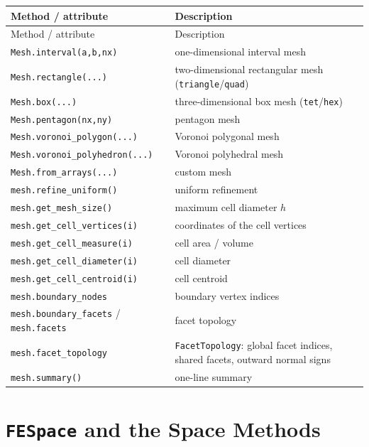 \documentclass[11pt,oneside]{book}
\theoremstyle{definition}
\theoremstyle{plain}
\newcommand{\code}[1]{\texttt{#1}}
\begin{document}
\begingroup\small
\begin{longtable}{@{}L{5.0cm}L{9.4cm}@{}}
\toprule
Method / attribute & Description \\
\midrule
\endfirsthead
\toprule
Method / attribute & Description \\
\midrule
\endhead
\code{Mesh.interval(a,\allowbreak b,\allowbreak nx)} & one-dimensional interval mesh \\
\code{Mesh.rectangle(...)} & two-dimensional rectangular mesh (\code{triangle}/\allowbreak\code{quad}) \\
\code{Mesh.box(...)} & three-dimensional box mesh (\code{tet}/\allowbreak\code{hex}) \\
\code{Mesh.pentagon(nx,\allowbreak ny)} & pentagon mesh \\
\code{Mesh.voronoi\_\allowbreak polygon(...)} & Voronoi polygonal mesh \\
\code{Mesh.voronoi\_\allowbreak polyhedron(...)} & Voronoi polyhedral mesh \\
\code{Mesh.from\_\allowbreak arrays(...)} & custom mesh \\
\code{mesh.refine\_\allowbreak uniform()} & uniform refinement \\
\code{mesh.get\_\allowbreak mesh\_\allowbreak size()} & maximum cell diameter $h$ \\
\code{mesh.get\_\allowbreak cell\_\allowbreak vertices(i)} & coordinates of the cell vertices \\
\code{mesh.get\_\allowbreak cell\_\allowbreak measure(i)} & cell area / volume \\
\code{mesh.get\_\allowbreak cell\_\allowbreak diameter(i)} & cell diameter \\
\code{mesh.get\_\allowbreak cell\_\allowbreak centroid(i)} & cell centroid \\
\code{mesh.boundary\_\allowbreak nodes} & boundary vertex indices \\
\code{mesh.boundary\_\allowbreak facets} / \code{mesh.facets} & facet topology \\
\code{mesh.facet\_\allowbreak topology} & \code{FacetTopology}: global facet indices, shared facets, outward normal signs \\
\code{mesh.summary()} & one-line summary \\
\bottomrule
\end{longtable}
\endgroup

\section{\code{FESpace} and the Space Methods}
\end{document}
